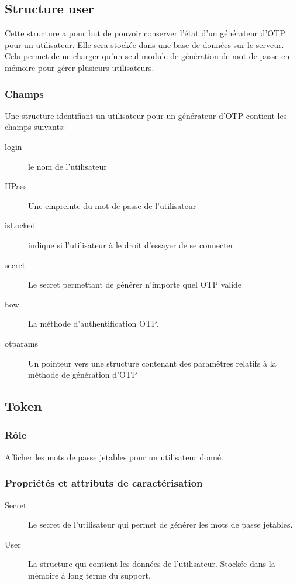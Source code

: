 \documentclass{"../../res/univ-projet"}
\begin{document}
\subsection{Structure user}
\label{sub:Structure_user}
    Cette structure a pour but de pouvoir conserver l'état d'un générateur d'OTP
    pour un utilisateur. Elle sera stockée dans une base de données sur le
    serveur. Cela permet de ne charger qu'un seul module de génération de mot de
    passe en mémoire pour gérer plusieurs utilisateurs.
    \subsubsection{Champs}
    \label{ssub:Champs}
        Une structure identifiant un utilisateur pour un générateur d'OTP 
        contient les champs suivants:
        \begin{description}
            \item[login] le nom de l'utilisateur
            \item[HPass] Une empreinte du mot de passe de l'utilisateur
            \item[isLocked] indique si l'utilisateur à le droit d'essayer de
                se connecter
            \item[secret] Le secret permettant de générer n'importe quel OTP 
                valide
            \item[how] La méthode d'authentification OTP.
            \item[otparams] Un pointeur vers une structure contenant des 
                paramêtres relatifs à la méthode de génération d'OTP
        \end{description}

\subsection{Token}
    \subsubsection{Rôle}
        Afficher les mots de passe jetables pour un utilisateur donné.

    \subsubsection{Propriétés et attributs de caractérisation}
    \begin{description}
        \item[Secret] Le secret de l'utilisateur qui permet de générer les
            mots de passe jetables.
        \item[User] La structure qui contient les données de l'utilisateur.
            Stock\'ee dans la m\'emoire à long terme du support.
    \end{description}
\end{document}
